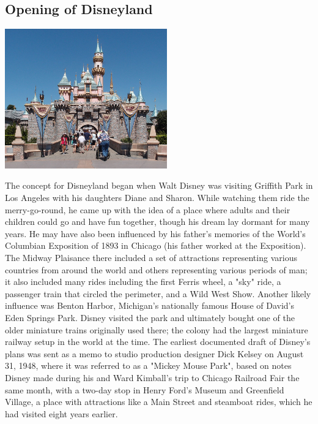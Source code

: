 \documentclass[11pt]{report}
\begin{document}
\subsection{Opening of Disneyland}
\vspace{2mm}\begin{center}\includegraphics[width=7cm]{./img/disneyland.jpg}\end{center}
The concept for Disneyland began when Walt Disney was visiting Griffith Park in Los Angeles with his daughters Diane and Sharon. While watching them ride the merry-go-round, he came up with the idea of a place where adults and their children could go and have fun together, though his dream lay dormant for many years. He may have also been influenced by his father's memories of the World's Columbian Exposition of 1893 in Chicago (his father worked at the Exposition). The Midway Plaisance there included a set of attractions representing various countries from around the world and others representing various periods of man; it also included many rides including the first Ferris wheel, a "sky" ride, a passenger train that circled the perimeter, and a Wild West Show. Another likely influence was Benton Harbor, Michigan's nationally famous House of David's Eden Springs Park. Disney visited the park and ultimately bought one of the older miniature trains originally used there; the colony had the largest miniature railway setup in the world at the time. The earliest documented draft of Disney's plans was sent as a memo to studio production designer Dick Kelsey on August 31, 1948, where it was referred to as a "Mickey Mouse Park", based on notes Disney made during his and Ward Kimball's trip to Chicago Railroad Fair the same month, with a two-day stop in Henry Ford's Museum and Greenfield Village, a place with attractions like a Main Street and steamboat rides, which he had visited eight years earlier.
\section{}
\end{document}
